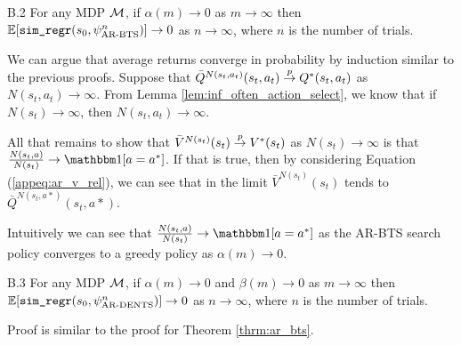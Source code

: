     \begin{customthm}{B.2} %
        For any MDP $\mathcal{M}$, if $\alpha(m)\rightarrow 0$ as $m\rightarrow\infty$ then $\mathbb{E}[{\textnormal{\texttt{sim\_regr}}}(s_0,\psi^n_{\textnormal{AR-BTS}})]\rightarrow 0$ as $n\rightarrow\infty$, where $n$ is the number of trials.
    \end{customthm}
    \begin{proofoutline}
        We can argue that average returns converge in probability by induction similar to the previous proofs. Suppose that $\bar{Q}^{N(s_t,a_t)}(s_t, a_t) \overset{p}{\to} Q^*(s_t,a_t)$ as $N(s_t,a_t)\rightarrow\infty$. From Lemma \ref{lem:inf_often_action_select}, we know that if $N(s_t)\rightarrow\infty$, then $N(s_t,a_t)\rightarrow\infty$.

        All that remains to show that $\bar{V}^{N(s_t)}(s_t) \overset{p}{\to} V^*(s_t)$ as $N(s_t)\rightarrow\infty$ is that $\frac{N(s_t,a)}{N(s_t)}\rightarrow \one[a=a^*]$. If that is true, then by considering Equation (\ref{appeq:ar_v_rel}), we can see that in the limit $\bar{V}^{N(s_t)}(s_t)$ tends to $\bar{Q}^{N(s_t,a*)}(s_t,a*)$. 

        Intuitively we can see that $\frac{N(s_t,a)}{N(s_t)}\rightarrow \one[a=a^*]$ as the AR-BTS search policy converges to a greedy policy as $\alpha(m)\rightarrow 0$. 
    \end{proofoutline}










    \begin{customthm}{B.3} 
        For any MDP $\mathcal{M}$, if $\alpha(m)\rightarrow 0$ and $\beta(m)\rightarrow 0$ as $m\rightarrow\infty$ then $\mathbb{E}[{\textnormal{\texttt{sim\_regr}}}(s_0,\psi^n_{\textnormal{AR-DENTS}})]\rightarrow 0$ as $n\rightarrow\infty$, where $n$ is the number of trials.
    \end{customthm}
    \begin{proofoutline}
        Proof is similar to the proof for Theorem \ref{thrm:ar_bts}.
    \end{proofoutline}
    
